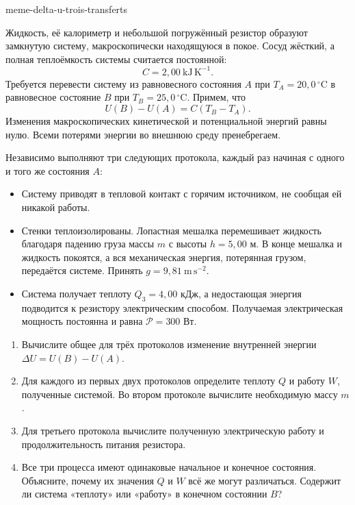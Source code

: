 \begin{exo}{meme-delta-u-trois-transferts}

Жидкость, её калориметр и небольшой погружённый резистор образуют замкнутую
систему, макроскопически находящуюся в покое. Сосуд жёсткий, а полная
теплоёмкость системы считается постоянной:
\[
C=2{,}00\ \mathrm{kJ\,K^{-1}}.
\]
Требуется перевести систему из равновесного состояния
$A$ при $T_A=20{,}0\,^\circ\mathrm{C}$ в равновесное состояние
$B$ при $T_B=25{,}0\,^\circ\mathrm{C}$. Примем, что
\[
U(B)-U(A)=C(T_B-T_A).
\]
Изменения макроскопических кинетической и потенциальной энергий равны нулю.
Всеми потерями энергии во внешнюю среду пренебрегаем.

Независимо выполняют три следующих протокола, каждый раз начиная с одного и того же состояния $A$:
\begin{itemize}
\item[Протокол 1] Систему приводят в тепловой контакт с горячим источником, не сообщая ей никакой работы.
\item[Протокол 2] Стенки теплоизолированы. Лопастная мешалка перемешивает жидкость благодаря падению груза массы $m$ с высоты $h=5{,}00$ м. В конце мешалка и жидкость покоятся, а вся механическая энергия, потерянная грузом, передаётся системе. Принять $g=9{,}81\ \mathrm{m\,s^{-2}}$.
\item[Протокол 3] Система получает теплоту $Q_3=4{,}00$ кДж, а недостающая энергия подводится к резистору электрическим способом. Получаемая электрическая мощность постоянна и равна $\mathcal P=300$ Вт.
\end{itemize}

\begin{enumerate}
\item Вычислите общее для трёх протоколов изменение внутренней энергии $\Delta U=U(B)-U(A)$.
\item Для каждого из первых двух протоколов определите теплоту $Q$ и работу $W$, полученные системой. Во втором протоколе вычислите необходимую массу $m$.
\item Для третьего протокола вычислите полученную электрическую работу и продолжительность питания резистора.
\item Все три процесса имеют одинаковые начальное и конечное состояния. Объясните, почему их значения $Q$ и $W$ всё же могут различаться. Содержит ли система «теплоту» или «работу» в конечном состоянии $B$?
\end{enumerate}


\end{exo}
